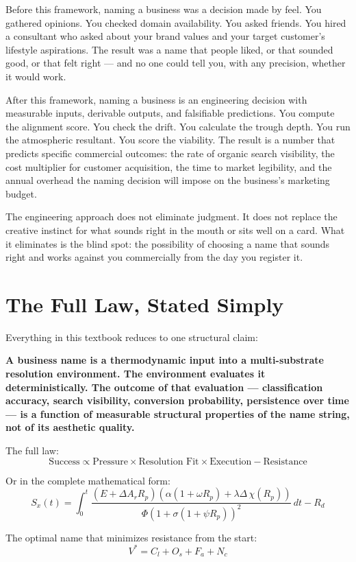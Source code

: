 \documentclass[12pt, openany]{book}
\theoremstyle{thmstyle}
\theoremstyle{defstyle}
\begin{document}
Before this framework, naming a business was a decision made by feel. You gathered opinions. You checked domain availability. You asked friends. You hired a consultant who asked about your brand values and your target customer's lifestyle aspirations. The result was a name that people liked, or that sounded good, or that felt right --- and no one could tell you, with any precision, whether it would work.

After this framework, naming a business is an engineering decision with measurable inputs, derivable outputs, and falsifiable predictions. You compute the alignment score. You check the drift. You calculate the trough depth. You run the atmospheric resultant. You score the viability. The result is a number that predicts specific commercial outcomes: the rate of organic search visibility, the cost multiplier for customer acquisition, the time to market legibility, and the annual overhead the naming decision will impose on the business's marketing budget.

The engineering approach does not eliminate judgment. It does not replace the creative instinct for what sounds right in the mouth or sits well on a card. What it eliminates is the blind spot: the possibility of choosing a name that sounds right and works against you commercially from the day you register it.

\section*{The Full Law, Stated Simply}

\begin{conclusionbox}
Everything in this textbook reduces to one structural claim:

\vspace{8pt}
\textbf{A business name is a thermodynamic input into a multi-substrate resolution environment. The environment evaluates it deterministically. The outcome of that evaluation --- classification accuracy, search visibility, conversion probability, persistence over time --- is a function of measurable structural properties of the name string, not of its aesthetic quality.}

\vspace{8pt}
The full law:
\[
\text{Success} \propto \text{Pressure} \times \text{Resolution Fit} \times \text{Execution} - \text{Resistance}
\]

\vspace{4pt}
Or in the complete mathematical form:
\[
S_x(t) = \int_0^t
\frac{(E + \Delta A_r R_p)(\alpha(1+\omega R_p) + \lambda\Delta\,\chi(R_p))}
{\Phi(1+\sigma(1+\psi R_p))^2}
\,dt - R_d
\]

\vspace{4pt}
The optimal name that minimizes resistance from the start:
\[
V^* = C_l + O_s + F_a + N_c
\]
\end{conclusionbox}
\end{document}

